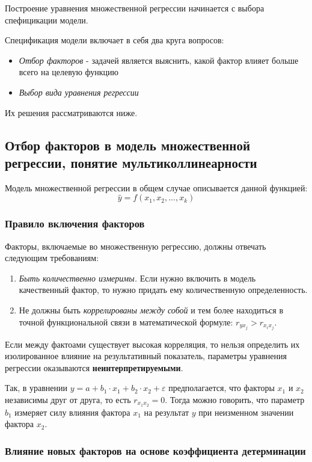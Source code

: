 \documentclass[aps,%
12pt,%
final,%
oneside,
onecolumn,%
musixtex, %
superscriptaddress,%
centertags]{article} %
\theoremstyle{plain}
\theoremstyle{definition}
\theoremstyle{remark}
\begin{document}
Построение уравнения множественной регрессии начинается с выбора спефицикации модели.

Спецификация модели включает в себя два круга вопросов:

\begin{itemize}
	\item \textit{Отбор факторов} - задачей является выяснить, какой фактор влияет больше всего на целевую функцию
	\item \textit{Выбор вида уравнения регрессии}
\end{itemize}

Их решения рассматриваются ниже.
\newpage
\subsection{Отбор факторов в модель множественной регрессии, понятие мультиколлинеарности}

Модель множественной регрессии в общем случае описывается данной функцией:
$$ \widehat{y} = f(x_1,x_2,...,x_k) $$

\subsubsection{Правило включения факторов}

Факторы, включаемые во множественную регрессию, должны отвечать следующим требованиям:
\begin{enumerate}
	\item \textit{Быть количественно измеримы.} Если нужно включить в модель качественный фактор, то нужно придать ему количественную определенность.
	\item Не должны быть \textit{коррелированы между собой} и тем более находиться в точной функциональной связи в математической формуле: $r_{yx_j} > r_{x_i{x_j}}$.
\end{enumerate}

Если между фактоами существует высокая корреляция, то нельзя определить их изолированное влияние на результативный показатель, параметры уравнения регрессии оказываются \textbf{неинтерпретируемыми}.

Так, в уравнении $y = a+b_1 \cdot x_1 + b_2 \cdot x_2 + \varepsilon$ предполагается, что факторы $x_1$ и $x_2$ независимы друг от друга, то есть $r_{x_1x_2}=0$. Тогда можно говорить, что параметр $b_1$ измеряет силу влияния фактора $x_1$ на результат $y$ при неизменном значении фактора $x_2$.

\subsubsection{Влияние новых факторов на основе коэффициента детерминации}
\end{document}
